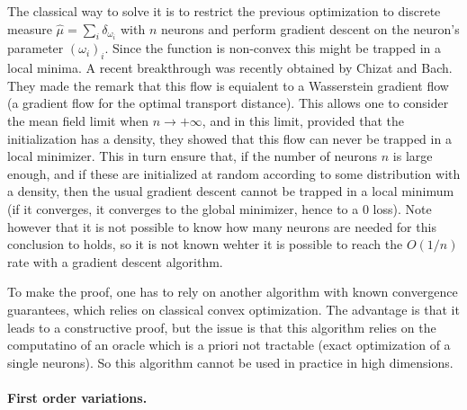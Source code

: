 The classical way to solve it is to restrict the previous optimization to discrete measure $\hat\mu = \sum_{i} \delta_{\omega_i}$ with $n$ neurons and perform gradient descent on the neuron's parameter $(\omega_i)_i$. Since the function is non-convex this might be trapped in a local minima. A recent breakthrough was recently obtained by Chizat and Bach. They made the remark that this flow is equialent to a Wasserstein gradient flow (a gradient flow for the optimal transport distance). This allows one to consider the mean field limit when $n \to +\infty$, and in this limit, provided that the initialization has a density, they showed that this flow can never be trapped in a local minimizer. This in turn ensure that, if the number of neurons $n$ is large enough, and if these are initialized at random according to some distribution with a density, then the usual gradient descent cannot be trapped in a local minimum (if it converges, it converges to the global minimizer, hence to a 0 loss). 
%
Note however that it is not possible to know how many neurons are needed for this conclusion to holds, so it is not known wehter it is possible to reach the $O(1/n)$ rate with a gradient descent algorithm.

To make the proof, one has to rely on another algorithm with known convergence guarantees, which relies on classical convex optimization. The advantage is that it leads to a constructive proof, but the issue is that this algorithm relies on the computatino of an oracle which is a priori not tractable (exact optimization of a single neurons). So this algorithm cannot be used in practice in high dimensions. 



\paragraph{First order variations.}

